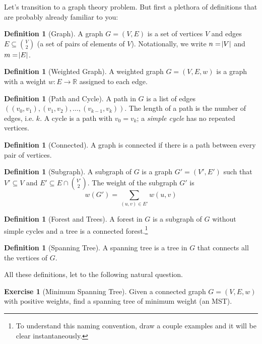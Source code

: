 \documentclass[10pt]{article}
\theoremstyle{plain}
\theoremstyle{definition}
\newtheorem{defn}[thm]{Definition} %
\newtheorem{exer}[thm]{Exercise}
\newcommand{\RR}{\mathbb{R}}
\numberwithin{equation}{section}
\numberwithin{figure}{section}
\begin{document}
Let's transition to a graph theory problem. But first a plethora of definitions that are probably already familiar to you:

\begin{defn}[Graph]
A graph $G = (V, E)$ is a set of vertices $V$ and edges $E \subseteq {V \choose 2}$ (a set of pairs of elements of $V$). Notationally, we write $n = \abs{V}$ and $m = \abs{E}$.
\end{defn}

\begin{defn}[Weighted Graph]
A weighted graph $G = (V, E, w)$ is a graph with a weight $w : E \rightarrow \RR$ assigned to each edge. 
\end{defn}

\begin{defn}[Path and Cycle]
A path in $G$ is a list of edges $\left( (v_0, v_1),(v_1, v_2), \ldots, (v_{k-1},v_k) \right)$. The length of a path is the number of edges, i.e. $k$. A cycle is a path with $v_0 = v_k$; a \emph{simple cycle} has no repeated vertices.
\end{defn}

\begin{defn}[Connected]
A graph is connected if there is a path between every pair of vertices.
\end{defn}

\begin{defn}[Subgraph]
A subgraph of $G$ is a graph $G' = (V', E')$ such that $V' \subseteq V$ and $E' \subseteq E \cap {V' \choose 2}$. The weight of the subgraph $G'$ is
\begin{equation}
w(G') = \sum_{(u,v) \in E'} w(u,v)
\end{equation}
\end{defn}

\begin{defn}[Forest and Trees]
A forest in $G$ is a subgraph of $G$ without simple cycles and a tree is a connected forest.\footnote{To understand this naming convention, draw a couple examples and it will be clear instantaneously.}
\end{defn}

\begin{defn}[Spanning Tree]
A spanning tree is a tree in $G$ that connects all the vertices of $G$.
\end{defn}

\noindent All these definitions, let to the following natural question.

\begin{exer}[Minimum Spanning Tree]
Given a connected graph $G = (V, E, w)$ with positive weights, find a spanning tree of minimum weight (an MST).
\end{exer}
\end{document}
